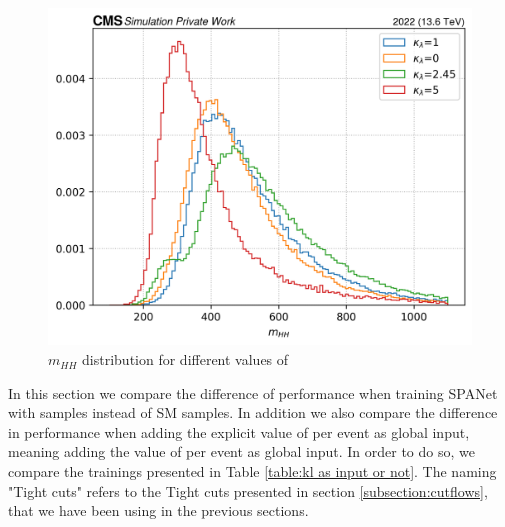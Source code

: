 \begin{figure}[hbt]
    \centering
    \includegraphics[width=0.5\linewidth]{Images/6.Improving/kappa lambda/mhh distribution for diff kl.png}
    \caption{$m_{HH}$ distribution for different values of \kl}
    \label{fig: mhh dist}
\end{figure}


\vspace{0.2cm}

In this section we compare the difference of performance when training SPANet with \kl samples instead of SM samples. In addition we also compare the difference in performance when adding the explicit value of \kl per event as global input, meaning adding the value of \kl per event as global input. In order to do so, we compare the trainings presented in Table \ref{table:kl as input or not}. The naming "Tight cuts" refers to the Tight cuts presented in section \ref{subsection:cutflows}, that we have been using in the previous sections. 

